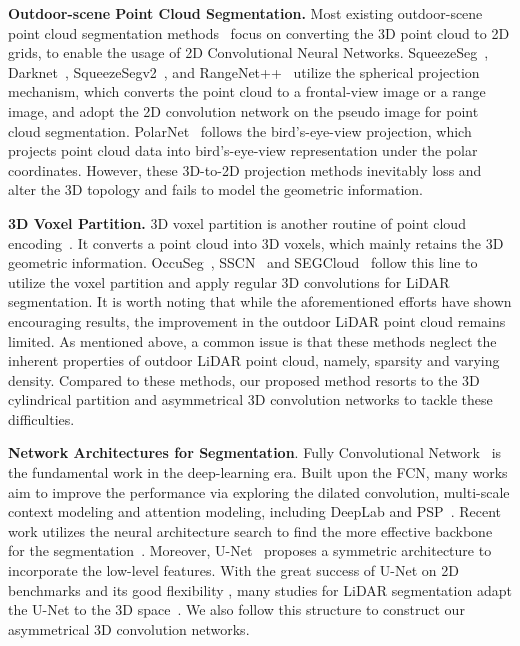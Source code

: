 \documentclass[final]{cvpr}
\begin{document}
   
   \textbf{Outdoor-scene Point Cloud Segmentation.}
   Most existing outdoor-scene point cloud segmentation methods~\cite{hu2020randla,cortinhal2020salsanext,milioto2019rangenet++,alonso20203d,zhang12356deep,landrieu2018large} focus on converting the 3D point cloud to 2D grids, to enable the usage of 2D Convolutional Neural Networks. SqueezeSeg~\cite{wu2018squeezeseg}, Darknet~\cite{behley2019semantickitti}, SqueezeSegv2~\cite{wu2019squeezesegv2},
  and RangeNet++~\cite{milioto2019rangenet++} utilize the spherical projection mechanism, which converts the point cloud to 
  a frontal-view image or a range image, and adopt the 2D convolution network on the pseudo image for point cloud segmentation. PolarNet~\cite{zhang2020polarnet} follows the bird's-eye-view projection, which projects point cloud data into bird's-eye-view representation under the polar coordinates. However, these 3D-to-2D projection methods inevitably loss and alter the 3D topology and fails to model the geometric information.
  
  \textbf{3D Voxel Partition.}
  3D voxel partition is another routine of point cloud encoding~\cite{han2020occuseg,tchapmi2017segcloud,graham20183d,cciccek20163d,meng2019vv}. It converts a point cloud into 3D voxels, which mainly retains the 3D geometric information. 
OccuSeg~\cite{han2020occuseg}, SSCN~\cite{graham20183d} and SEGCloud~\cite{tchapmi2017segcloud} follow this line to utilize the voxel partition and apply regular 3D convolutions for LiDAR segmentation. It is worth noting that while the aforementioned efforts have shown encouraging results, the improvement in the outdoor LiDAR point cloud remains limited. As mentioned above, a common issue is that these methods neglect the inherent properties of outdoor LiDAR point cloud, namely, sparsity and varying density. Compared to these methods, our proposed method resorts to the 3D cylindrical partition and asymmetrical 3D convolution networks to tackle these difficulties.






\textbf{Network Architectures for Segmentation}. Fully Convolutional Network~\cite{long2015fully} is the fundamental work in the deep-learning era. Built upon the FCN, many works aim to improve the performance via exploring the dilated convolution, multi-scale context modeling and attention modeling, including DeepLab\cite{chen2017deeplab, chen2018encoder} and PSP~\cite{zhao2017pyramid}. Recent work utilizes the neural architecture search to find the more effective backbone for the segmentation~\cite{liu2019auto,tang2020searching}. Moreover, U-Net~\cite{ronneberger2015u} proposes a symmetric architecture to incorporate the low-level features. With the great success of U-Net on 2D benchmarks and its good flexibility , many studies for LiDAR segmentation adapt the U-Net to the 3D space~\cite{cciccek20163d}. We also follow this structure to construct our asymmetrical 3D convolution networks.
\end{document}
